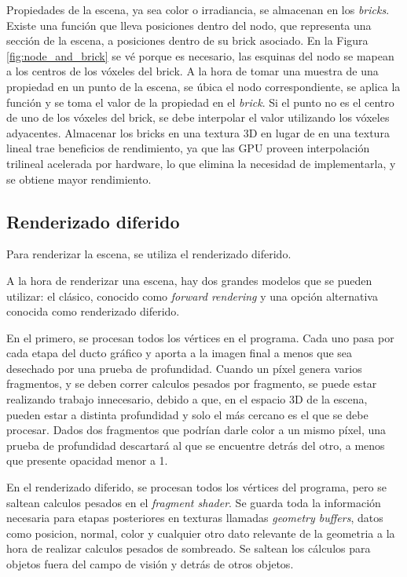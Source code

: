 Propiedades de la escena, ya sea color o irradiancia, se almacenan en los \textit{bricks}.
Existe una función que lleva posiciones dentro del nodo, que representa una sección de la escena, a posiciones dentro de su brick asociado.
En la Figura \ref{fig:node_and_brick} se vé porque es necesario, las esquinas del nodo se mapean a los centros de los vóxeles del brick.
A la hora de tomar una muestra de una propiedad en un punto de la escena, se úbica el nodo correspondiente, se aplica la función y se toma el valor de la propiedad en el \textit{brick}.
Si el punto no es el centro de uno de los vóxeles del brick, se debe interpolar el valor utilizando los vóxeles adyacentes.
Almacenar los bricks en una textura 3D en lugar de en una textura lineal trae beneficios de rendimiento, ya que las GPU proveen interpolación trilineal acelerada por hardware, lo que elimina la necesidad de implementarla, y se obtiene mayor rendimiento.

\subsection{Renderizado diferido}\label{sec:deferred-rendering}

Para renderizar la escena, se utiliza el renderizado diferido.

A la hora de renderizar una escena, hay dos grandes modelos que se pueden utilizar: el clásico, conocido como \textit{forward rendering} y una opción alternativa conocida como renderizado diferido.

En el primero, se procesan todos los vértices en el programa.
Cada uno pasa por cada etapa del ducto gráfico y aporta a la imagen final a menos que sea desechado por una prueba de profundidad.
Cuando un píxel genera varios fragmentos, y se deben correr calculos pesados por fragmento, se puede estar realizando trabajo innecesario, debido a que, en el espacio 3D de la escena, pueden estar a distinta profundidad y solo el más cercano es el que se debe procesar.
Dados dos fragmentos que podrían darle color a un mismo píxel, una prueba de profundidad descartará al que se encuentre detrás del otro, a menos que presente opacidad menor a 1.

En el renderizado diferido, se procesan todos los vértices del programa, pero se saltean calculos pesados en el \textit{fragment shader}.
Se guarda toda la información necesaria para etapas posteriores en texturas llamadas \textit{geometry buffers}, datos como posicion, normal, color y cualquier otro dato relevante de la geometria a la hora de realizar calculos pesados de sombreado.
Se saltean los cálculos para objetos fuera del campo de visión y detrás de otros objetos.

